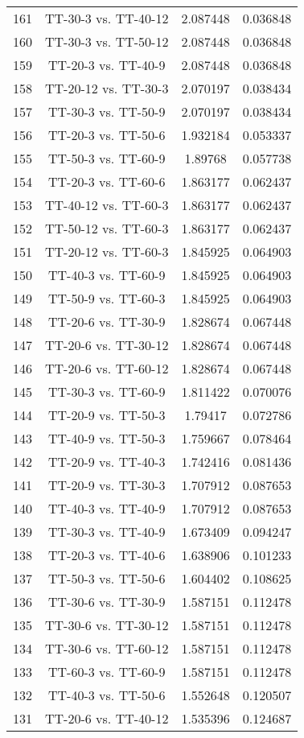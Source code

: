 \documentclass[a4paper,10pt]{article}
\begin{document}
\begin{landscape}
\begin{table}[!htp]
\begin{tabular}{cccc}
161&TT-30-3 vs. TT-40-12&2.087448&0.036848\\
160&TT-30-3 vs. TT-50-12&2.087448&0.036848\\
159&TT-20-3 vs. TT-40-9&2.087448&0.036848\\
158&TT-20-12 vs. TT-30-3&2.070197&0.038434\\
157&TT-30-3 vs. TT-50-9&2.070197&0.038434\\
156&TT-20-3 vs. TT-50-6&1.932184&0.053337\\
155&TT-50-3 vs. TT-60-9&1.89768&0.057738\\
154&TT-20-3 vs. TT-60-6&1.863177&0.062437\\
153&TT-40-12 vs. TT-60-3&1.863177&0.062437\\
152&TT-50-12 vs. TT-60-3&1.863177&0.062437\\
151&TT-20-12 vs. TT-60-3&1.845925&0.064903\\
150&TT-40-3 vs. TT-60-9&1.845925&0.064903\\
149&TT-50-9 vs. TT-60-3&1.845925&0.064903\\
148&TT-20-6 vs. TT-30-9&1.828674&0.067448\\
147&TT-20-6 vs. TT-30-12&1.828674&0.067448\\
146&TT-20-6 vs. TT-60-12&1.828674&0.067448\\
145&TT-30-3 vs. TT-60-9&1.811422&0.070076\\
144&TT-20-9 vs. TT-50-3&1.79417&0.072786\\
143&TT-40-9 vs. TT-50-3&1.759667&0.078464\\
142&TT-20-9 vs. TT-40-3&1.742416&0.081436\\
141&TT-20-9 vs. TT-30-3&1.707912&0.087653\\
140&TT-40-3 vs. TT-40-9&1.707912&0.087653\\
139&TT-30-3 vs. TT-40-9&1.673409&0.094247\\
138&TT-20-3 vs. TT-40-6&1.638906&0.101233\\
137&TT-50-3 vs. TT-50-6&1.604402&0.108625\\
136&TT-30-6 vs. TT-30-9&1.587151&0.112478\\
135&TT-30-6 vs. TT-30-12&1.587151&0.112478\\
134&TT-30-6 vs. TT-60-12&1.587151&0.112478\\
133&TT-60-3 vs. TT-60-9&1.587151&0.112478\\
132&TT-40-3 vs. TT-50-6&1.552648&0.120507\\
131&TT-20-6 vs. TT-40-12&1.535396&0.124687\\

\end{tabular}
\end{table}
\end{landscape}
\end{document}
